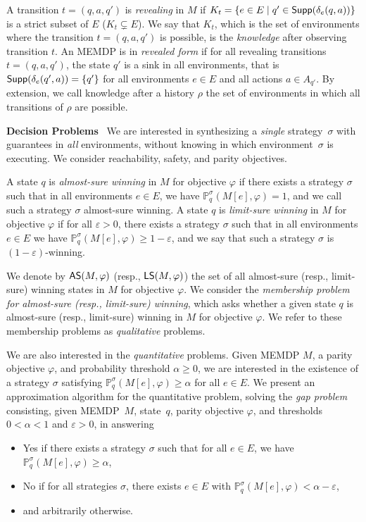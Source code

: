 \documentclass[a4paper,USenglish,cleveref, autoref, thm-restate]{lipics-v2021}
\let\epsilon\varepsilon
\def\myparagraph#1{\noindent\textbf{#1}~}
\newcommand*{\pr}{\mathbb{P}}
\newcommand\Supp{\textrm{\sf Supp}}
\newcommand\almostsure{\textrm{\sf AS}}
\newcommand\limitsure{\textrm{\sf LS}}
\begin{document}
A transition $t = (q,a,q')$ is \emph{revealing} in $M$ 
if $K_{t} = \{ e \in E \mid q' \in \Supp(\delta_e(q,a))\}$
is a strict subset of $E$ ($K_{t} \subsetneq E$).
We say that $K_{t}$, which is the set of environments where the transition $t = (q,a,q')$
is possible, is the \emph{knowledge} after observing transition $t$.
An MEMDP is in \emph{revealed form} if for all revealing transitions $t = (q,a,q')$,
the state $q'$ is a sink in all environments, that is 
$\Supp(\delta_e(q',a)) = \{q'\}$ for all environments $e \in E$ and all actions $a \in A_{q'}$.
By extension, we call knowledge after a history $\rho$ the set of
environments in which all transitions of $\rho$ are possible.




\smallskip
\myparagraph{Decision Problems}
We are interested in synthesizing a \emph{single} strategy~$\sigma$ with guarantees in
\emph{all} environments, without knowing in which 
environment~$\sigma$ is executing.
We consider reachability, safety, and parity objectives.

A state $q$ is \emph{almost-sure winning} in $M$ for objective $\varphi$
if there exists a strategy $\sigma$ such that in all environments $e \in E$,
we have $\pr_{q}^{\sigma}(M[e], \varphi) = 1$, and we call such a strategy 
$\sigma$ almost-sure winning. 
A state $q$ is \emph{limit-sure winning} in $M$ for objective $\varphi$
if for all $\epsilon > 0$, there exists  a strategy $\sigma$ such that in all 
environments $e \in E$ we have $\pr_{q}^{\sigma}(M[e], \varphi) \geq  1-\epsilon$,
and we say that such a strategy $\sigma$ is $(1-\epsilon)$-winning.

We denote by $\almostsure(M, \varphi)$ (resp., $\limitsure(M, \varphi)$) the set
of all almost-sure (resp., limit-sure) winning states in $M$ for objective $\varphi$.
We consider the \emph{membership problem for almost-sure (resp., limit-sure) winning},
which asks whether a given state $q$ is almost-sure (resp., limit-sure) winning
in $M$ for objective $\varphi$. We refer to these membership problems as 
\emph{qualitative} problems.


We are also interested in the \emph{quantitative} problems.
Given MEMDP $M$, a parity objective $\varphi$, and probability threshold $\alpha\geq 0$,
we are interested in the existence of a strategy $\sigma$ satisfying
$\pr^\sigma_q(M[e], \varphi)\geq \alpha$ for all $e\in E$.
We present an approximation algorithm for the quantitative problem, solving the \emph{gap problem} consisting,
given MEMDP~$M$, state~$q$, parity objective $\varphi$, and
	thresholds~$0 < \alpha < 1$ and $\epsilon > 0$, in answering
	\begin{itemize}
		\item \textsf{Yes} if there exists a strategy $\sigma$ such that for all $e \in E$, we have
			$\pr_{q}^{\sigma}(M[e], \varphi)\geq \alpha$,
		\item \textsf{No} if for all strategies $\sigma$, there exists $e \in E$ with $\pr_{q}^{\sigma}(M[e],\varphi)<
			\alpha - \epsilon$,
		\item and arbitrarily otherwise.
	\end{itemize}
\end{document}
